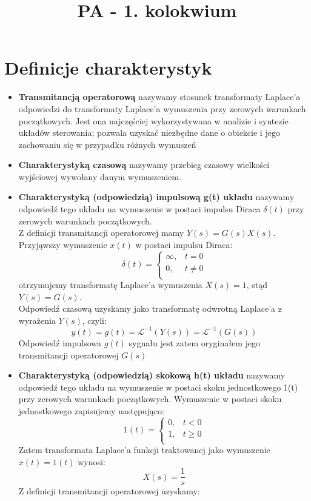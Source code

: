\documentclass[a4paper]{article}
\author{}
\title{PA - 1. kolokwium}
\date{}
\begin{document}
\maketitle
\section{Definicje charakterystyk}
\begin{itemize}
\item \textbf{Transmitancją operatorową} nazywamy stosunek transformaty Laplace’a odpowiedzi do transformaty Laplace’a wymuszenia przy zerowych warunkach początkowych. Jest ona najczęściej wykorzystywana w analizie i syntezie układów sterowania; pozwala uzyskać niezbędne dane o obiekcie i jego zachowaniu się w przypadku różnych wymuszeń
\item \textbf{Charakterystyką czasową} nazywamy przebieg czasowy wielkości wyjściowej wywołany danym wymuszeniem.
\item \textbf{Charakterystyką (odpowiedzią) impulsową g(t) układu} nazywamy odpowiedź tego układu na wymuszenie w postaci impulsu Diraca $\delta(t)$ przy zerowych warunkach początkowych.\\ Z definicji transmitancji operatorowej mamy $Y(s) = G(s)X(s)$. Przyjąwszy wymuszenie $x(t)$ w postaci impulsu Diraca:
$$
\delta (t) = 
\begin{cases}
\infty,& t = 0\\
0,& t\neq 0 \\ 
\end{cases}
$$
otrzymujemy transformatę Laplace'a wymuszenia $X(s)=1$, stąd $Y(s)=G(s)$.\\
Odpowiedź czasową uzyskamy jako transformatę odwrotną Laplace'a z wyrażenia $Y(s)$, czyli:
$$y(t)=g(t)=\mathcal{L}^{-1}(Y(s))=\mathcal{L}^{-1}(G(s))$$
Odpowiedź impulsowa $g(t)$ sygnału jest zatem oryginałem jego transmitancji operatorowej $G(s)$
\item \textbf{Charakterystyką (odpowiedzią) skokową h(t) układu} nazywamy odpowiedź tego układu na wymuszenie w postaci skoku jednostkowego 1(t) przy zerowych warunkach początkowych. Wymuszenie w postaci skoku jednostkowego zapisujemy następująco: 
$$
1(t) = 
\begin{cases}
0,& t<0\\
1,& t\geq 0\\
\end{cases}
$$
Zatem transformata Laplace'a funkcji traktowanej jako wymuszenie $x(t) = 1(t)$ wynosi:
$$ X(s) = \frac{1}{s} $$
Z definicji transmitancji operatorowej uzyskamy:

\end{itemize}
\end{document}
